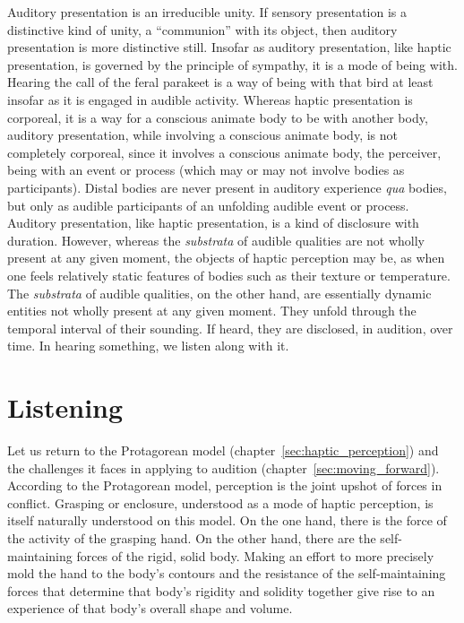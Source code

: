 Auditory presentation is an irreducible unity. If sensory presentation is a distinctive kind of unity, a ``communion'' with its object, then auditory presentation is more distinctive still. Insofar as auditory presentation, like haptic presentation, is governed by the principle of sympathy, it is a mode of being with. Hearing the call of the feral parakeet is a way of being with that bird at least insofar as it is engaged in audible activity. Whereas haptic presentation is corporeal, it is a way for a conscious animate body to be with another body, auditory presentation, while involving a conscious animate body, is not completely corporeal, since it involves a conscious animate body, the perceiver, being with an event or process (which may or may not involve bodies as participants). Distal bodies are never present in auditory experience \emph{qua} bodies, but only as audible participants of an unfolding audible event or process. Auditory presentation, like haptic presentation, is a kind of disclosure with duration. However, whereas the \emph{substrata} of audible qualities are not wholly present at any given moment, the objects of haptic perception may be, as when one feels relatively static features of bodies such as their texture or temperature. The \emph{substrata} of audible qualities, on the other hand, are essentially dynamic entities not wholly present at any given moment. They unfold through the temporal interval of their sounding. If heard, they are disclosed, in audition, over time. In hearing something, we listen along with it.


\section{Listening} %
\label{sec:listening}

Let us return to the Protagorean model (chapter~\ref{sec:haptic_perception}) and the challenges it faces in applying to audition (chapter~\ref{sec:moving_forward}). According to the Protagorean model, perception is the joint upshot of forces in conflict. Grasping or enclosure, understood as a mode of haptic perception, is itself naturally understood on this model. On the one hand, there is the force of the activity of the grasping hand. On the other hand, there are the self-maintaining forces of the rigid, solid body. Making an effort to more precisely mold the hand to the body's contours and the resistance of the self-maintaining forces that determine that body's rigidity and solidity together give rise to an experience of that body's overall shape and volume. 

